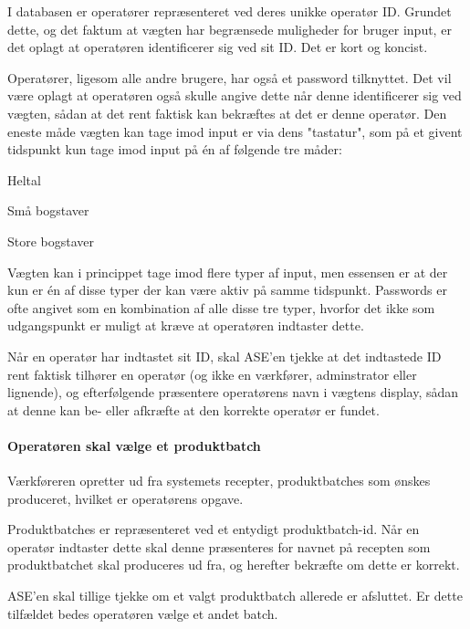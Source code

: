 \documentclass[a4paper]{article}
\newenvironment{my_itemize}
{\begin{itemize}
  \setlength{\itemsep}{1pt}
  \setlength{\parskip}{0pt}
  \setlength{\parsep}{0pt}}
{\end{itemize}}
\begin{document}
I databasen er operatører repræsenteret ved deres unikke operatør ID. Grundet dette, og det faktum at vægten har begrænsede muligheder for bruger input, er det oplagt at operatøren identificerer sig ved sit ID. Det er kort og koncist.

Operatører, ligesom alle andre brugere, har også et password tilknyttet. Det vil være oplagt at operatøren også skulle angive dette når denne identificerer sig ved vægten, sådan at det rent faktisk kan bekræftes at det er denne operatør. Den eneste måde vægten kan tage imod input er via dens "tastatur", som på et givent tidspunkt kun tage imod input på én af følgende tre måder:
\begin{my_itemize}
  \item Heltal
  \item Små bogstaver
  \item Store bogstaver
\end{my_itemize}
Vægten kan i princippet tage imod flere typer af input, men essensen er at der kun er én af disse typer der kan være aktiv på samme tidspunkt. Passwords er ofte angivet som en kombination af alle disse tre typer, hvorfor det ikke som udgangspunkt er muligt at kræve at operatøren indtaster dette.

Når en operatør har indtastet sit ID, skal ASE'en tjekke at det indtastede ID rent faktisk tilhører en operatør (og ikke en værkfører, adminstrator eller lignende), og efterfølgende præsentere operatørens navn i vægtens display, sådan at denne kan be- eller afkræfte at den korrekte operatør er fundet.


\paragraph{Operatøren skal vælge et produktbatch} %

Værkføreren opretter ud fra systemets recepter, produktbatches som ønskes produceret, hvilket er operatørens opgave.

Produktbatches er repræsenteret ved et entydigt produktbatch-id. Når en operatør indtaster dette skal denne præsenteres for navnet på recepten som produktbatchet skal produceres ud fra, og herefter bekræfte om dette er korrekt.

ASE'en skal tillige tjekke om et valgt produktbatch allerede er afsluttet. Er dette tilfældet bedes operatøren vælge et andet batch.
\end{document}
